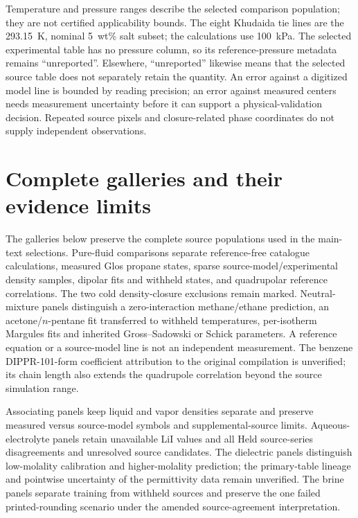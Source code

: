 Temperature and pressure ranges describe the selected comparison population; they are not certified applicability bounds.
The eight Khudaida tie lines are the 293.15~K, nominal 5~wt\% salt subset; the calculations use 100~kPa.
The selected experimental table has no pressure column, so its reference-pressure metadata remains ``unreported''.
Elsewhere, ``unreported'' likewise means that the selected source table does not separately retain the quantity.
An error against a digitized model line is bounded by reading precision; an error against measured centers needs measurement uncertainty before it can support a physical-validation decision.
Repeated source pixels and closure-related phase coordinates do not supply independent observations.

\section{Complete galleries and their evidence limits}
\label{sec:si-galleries}
The galleries below preserve the complete source populations used in the main-text selections.
Pure-fluid comparisons separate reference-free catalogue calculations, measured Glos propane states, sparse source-model/experimental density samples, dipolar fits and withheld states, and quadrupolar reference correlations.
The two cold density-closure exclusions remain marked.
Neutral-mixture panels distinguish a zero-interaction methane/ethane prediction, an acetone/$n$-pentane fit transferred to withheld temperatures, per-isotherm Margules fits and inherited Gross--Sadowski or Schick parameters.
A reference equation or a source-model line is not an independent measurement.
The benzene DIPPR-101-form coefficient attribution to the original compilation is unverified; its chain length also extends the quadrupole correlation beyond the source simulation range.

Associating panels keep liquid and vapor densities separate and preserve measured versus source-model symbols and supplemental-source limits.
Aqueous-electrolyte panels retain unavailable LiI values and all Held source-series disagreements and unresolved source candidates.
The dielectric panels distinguish low-molality calibration and higher-molality prediction; the primary-table lineage and pointwise uncertainty of the permittivity data remain unverified.
The brine panels separate training from withheld sources and preserve the one failed printed-rounding scenario under the amended source-agreement interpretation.

